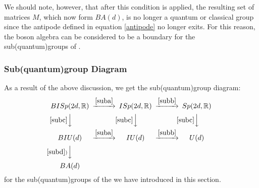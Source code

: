 We should note, however, that after this condition is applied, the
resulting set of matrices $M$, which now form $BA(d)$, is
no longer a quantum or classical group since the antipode defined
in equation \eqref{antipode} no longer exits. For this reason,
the boson algebra can be considered to be a boundary for the
sub(quantum)groups of \BISp.

\subsubsection{Sub(quantum)group Diagram}
As a result of the above discussion, we get the sub(quantum)group
diagram:
\[
\begin{CD}
{BISp(2d, \IR)} @>\eqref{suba}>> {ISp(2d, \IR)} @>\eqref{subb}>> {Sp(2d, \IR)} \\
@V\eqref{subc}VV @V\eqref{subc}VV @V\eqref{subc}VV \\
{BIU(d)} @>\eqref{suba}>> {IU(d)} @>\eqref{subb}>> {U(d)} \\
@V\eqref{subd})VV \\
{BA(d)}
\end{CD}
\]
for the sub(quantum)groups of the \BISp we have introduced in this
section.


